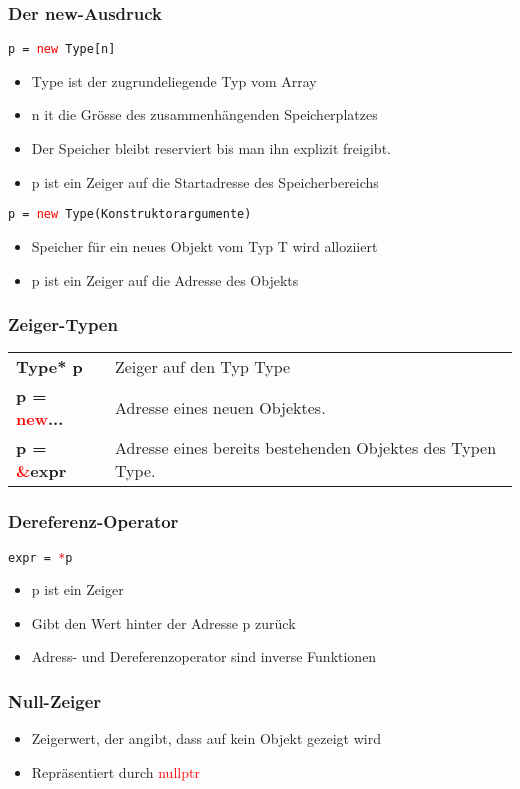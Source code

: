 \documentclass[a3paper, 10pt, landscape]{scrartcl}
\newcommand{\code}[1]{\texttt{#1}}
\begin{document}
\begin{multicols*}{3}
	\subsubsection{Der new-Ausdruck}
	\code{p = \textcolor{red}{new} Type[n]}
	\begin{itemize}
		\item Type ist der zugrundeliegende Typ vom Array
		\item n it die Grösse des zusammenhängenden Speicherplatzes
		\item Der Speicher bleibt reserviert bis man ihn explizit freigibt.
		\item p ist ein Zeiger auf die Startadresse des Speicherbereichs \\
	\end{itemize}
	
	\code{p = \textcolor{red}{new} Type(Konstruktorargumente)}
	\begin{itemize}
		\item Speicher für ein neues Objekt vom Typ T wird alloziiert
		\item p ist ein Zeiger auf die Adresse des Objekts
	\end{itemize}
	
	\subsubsection{Zeiger-Typen}
	\begin{tabular}{l l}
		\textbf{Type* p} & Zeiger auf den Typ Type \\
		\textbf{p = \textcolor{red}{new}...} & Adresse eines neuen Objektes. \\
		\textbf{p = \textcolor{red}{\&}expr} & Adresse eines bereits bestehenden Objektes des Typen Type.
	\end{tabular}
	
	\subsubsection{Dereferenz-Operator}
	\code{expr = \textcolor{red}{*}p}
	\begin{itemize}
		\item p ist ein Zeiger
		\item Gibt den Wert hinter der Adresse p zurück
		\item Adress- und Dereferenzoperator sind inverse Funktionen
	\end{itemize}
	
	\subsubsection{Null-Zeiger}
	\begin{itemize}
		\item Zeigerwert, der angibt, dass auf kein Objekt gezeigt wird
		\item Repräsentiert durch \textcolor{red}{nullptr}
	\end{itemize}
	

\end{multicols*}
\end{document}
